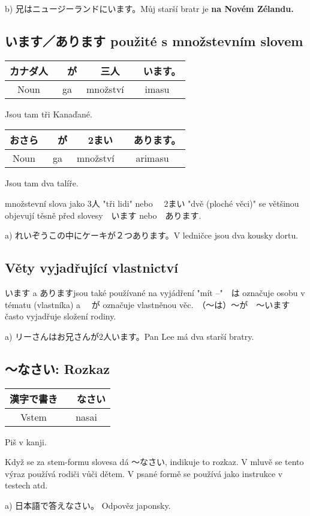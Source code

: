 b) 兄はニュージーランドにいます。Můj starší bratr je \textbf{na Novém Zélandu.}


\subsection{います／あります použité s množstevním slovem}
\begin{center}
\begin{tabular}{|c|c|c|c}
\hline
カナダ人&　が&　三人&　います。\\
\hline
Noun&ga& množství&imasu\\
\hline
\end{tabular}
\end{center}
Jsou tam tři Kanaďané.


\begin{center}
\begin{tabular}{|c|c|c|c}
\hline
おさら&　が&　2まい&　あります。\\
\hline
Noun&ga&množství&arimasu\\
\hline
\end{tabular}
\end{center}
Jsou tam dva talíře.

množstevní slova jako 3人 "tři lidi" nebo 　2まい "dvě (ploché věci)" se většinou objevují těsně před slovesy　います nebo　あります.

a) れいぞうこの中にケーキが２つあります。V ledničce jsou dva kousky dortu.

\subsection{Věty vyjadřující vlastnictví}

います a ありますjsou také používané na vyjádření "mít --"　は označuje osobu v tématu (vlastníka) a 　が  označuje vlastněnou věc.　（〜は）〜が　〜います často vyjadřuje složení rodiny.

a) リーさんはお兄さんが2人います。Pan Lee má dva starší bratry.



\subsection{〜なさい: Rozkaz}
\begin{center}
\begin{tabular}{|c|c|}
\hline
漢字で書き&　なさい\\
\hline
Vstem&nasai\\
\hline
\end{tabular}
\end{center}
Piš v kanji.

Když se za stem-formu slovesa dá 〜なさい, indikuje to rozkaz. V mluvě se tento výraz používá rodiči vůči dětem. V psané formě se používá jako instrukce v testech atd.

a) 日本語で答えなさい。 Odpověz japonsky.　